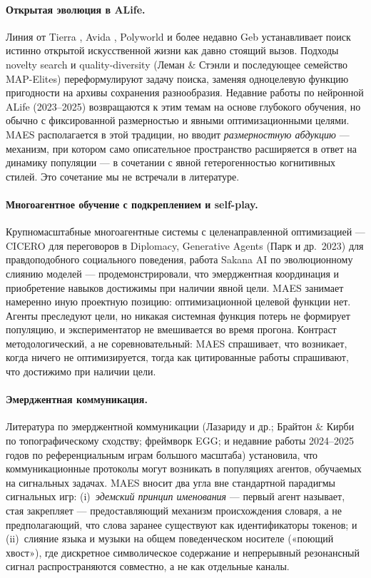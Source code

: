 \documentclass[11pt,a4paper]{article}
\begin{document}
\paragraph{Открытая эволюция в ALife.}
Линия от Tierra \cite{ray1991tierra}, Avida \cite{ofria2004avida},
Polyworld \cite{yaeger1994polyworld} и более недавно Geb
\cite{channon2003geb} устанавливает поиск истинно открытой искусственной
жизни как давно стоящий вызов. Подходы novelty search и quality-diversity
(Леман \& Стэнли и последующее семейство MAP-Elites) переформулируют
задачу поиска, заменяя одноцелевую функцию пригодности на архивы
сохранения разнообразия. Недавние работы по нейронной ALife (2023--2025)
возвращаются к этим темам на основе глубокого обучения, но обычно
с фиксированной размерностью и явными оптимизационными целями. MAES
располагается в этой традиции, но вводит \emph{размерностную абдукцию} ---
механизм, при котором само описательное пространство расширяется в
ответ на динамику популяции --- в сочетании с явной гетерогенностью
когнитивных стилей. Это сочетание мы не встречали в литературе.

\paragraph{Многоагентное обучение с подкреплением и self-play.}
Крупномасштабные многоагентные системы с целенаправленной оптимизацией ---
CICERO для переговоров в Diplomacy, Generative Agents (Парк и др.~2023)
для правдоподобного социального поведения, работа Sakana AI по
эволюционному слиянию моделей --- продемонстрировали, что эмерджентная
координация и приобретение навыков достижимы при наличии явной цели.
MAES занимает намеренно иную проектную позицию: оптимизационной целевой
функции нет. Агенты преследуют цели, но никакая системная функция потерь
не формирует популяцию, и экспериментатор не вмешивается во время
прогона. Контраст методологический, а не соревновательный: MAES
спрашивает, что возникает, когда ничего не оптимизируется, тогда как
цитированные работы спрашивают, что достижимо при наличии цели.

\paragraph{Эмерджентная коммуникация.}
Литература по эмерджентной коммуникации (Лазариду и др.; Брайтон \& Кирби
по топографическому сходству; фреймворк EGG; и недавние работы 2024--2025
годов по референциальным играм большого масштаба) установила, что
коммуникационные протоколы могут возникать в популяциях агентов,
обучаемых на сигнальных задачах. MAES вносит два угла вне стандартной
парадигмы сигнальных игр: (i)~\emph{эдемский принцип именования} ---
первый агент называет, стая закрепляет --- предоставляющий механизм
происхождения словаря, а не предполагающий, что слова заранее существуют
как идентификаторы токенов; и (ii)~слияние языка и музыки на общем
поведенческом носителе («поющий хвост»), где дискретное символическое
содержание и непрерывный резонансный сигнал распространяются совместно,
а не как отдельные каналы.
\end{document}
